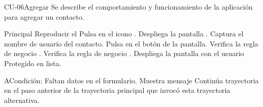 \begin{UseCase}{CU-06}{Agregar}{
	Se describe el comportamiento y funcionamiento de la aplicación para agregar un contacto.
}
	\end{UseCase}
	\begin{UCtrayectoria}{Principal}
		\UCpaso Reproducir el 
		\UCpaso[\UCactor] Pulsa en el icono .
		\UCpaso[\UCsist] Despliega la pantalla .
		\UCpaso[\UCactor] Captura el nombre de usuario del contacto.
		\UCpaso[\UCactor] Pulsa en el botón  de la pantalla.
		\UCpaso[\UCsist] Verifica la regla de negocio . 
		\UCpaso[\UCsist] Verifica la regla de negocio .  
		\UCpaso[\UCsist] Despliega la pantalla  con el usuario Protegido en lista.
	\end{UCtrayectoria}
	\begin{UCtrayectoriaA}{A}{Condición: Faltan datos en el formulario.}
		\UCpaso[\UCsist] Muestra mensaje 
		\UCpaso[\UCsist] Continúa trayectoria en el paso anterior de la trayectoria  principal que invocó esta trayectoria alternativa. 
	\end{UCtrayectoriaA}
